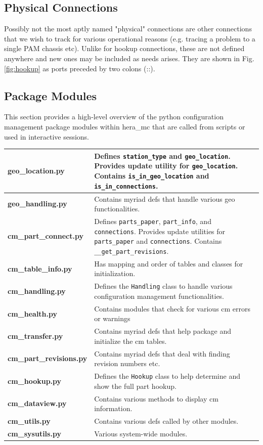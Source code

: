 \documentclass{article}
\begin{document}
\subsection{Physical Connections}
Possibly not the most aptly named "physical" connections are other connections that we wish to track for various operational reasons (e.g. tracing a problem to a single PAM chassis etc).  Unlike for hookup connections, these are not defined anywhere and new ones may be included as needs arises.  They are shown in Fig. \ref{fig:hookup} as ports preceded by two colons (::).

\subsection{Package Modules}
This section provides a high-level overview of the python configuration management package modules within hera\_mc that are called from scripts or used in interactive sessions.
\vspace{0.5cm}

\begin{tabular}{l p{12cm}}
{\bf geo\_location.py} & Defines {\tt station\_type} and {\tt geo\_location}.  Provides update utility for {\tt geo\_location}.  Contains {\tt is\_in\_geo\_location} and {\tt is\_in\_connections}. \\ \hline
{\bf geo\_handling.py} & Contains myriad defs that handle various geo functionalities.\\ \hline
{\bf cm\_part\_connect.py} & Defines {\tt parts\_paper}, {\tt part\_info}, and {\tt connections}.  Provides update utilities for {\tt parts\_paper} and {\tt connections}. Contains {\tt \_\_get\_part\_revisions}. \\ \hline
{\bf cm\_table\_info.py} & Has mapping and order of tables and classes for initialization. \\ \hline
{\bf cm\_handling.py} & Defines the {\tt Handling} class to handle various configuration management functionalities.\\ \hline
{\bf cm\_health.py} & Contains modules that check for various cm errors or warnings \\ \hline
{\bf cm\_transfer.py} & Contains myriad defs that help package and initialize the cm tables.\\ \hline
{\bf cm\_part\_revisions.py} & Contains myriad defs that deal with finding revision numbers etc.\\ \hline
{\bf cm\_hookup.py} & Defines the {\tt Hookup} class to help determine and show the full part hookup.\\ \hline
{\bf cm\_dataview.py} & Contains various methods to display cm information.\\ \hline
{\bf cm\_utils.py} & Contains various defs called by other modules.\\ \hline
{\bf cm\_sysutils.py} & Various system-wide modules.
\end{tabular}
\end{document}
